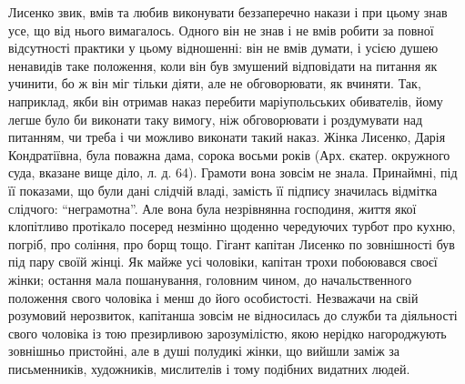 \documentclass[a4paper,20pt]{report}
\begin{document}
Лисенко звик, вмів та любив виконувати беззаперечно накази і при цьому знав усе, що від нього вимагалось.
Одного він не знав і не вмів робити за повної відсутності практики у цьому відношенні: він не вмів думати,
і усією душею ненавидів таке положення, коли він був змушений відповідати на питання як учинити,
бо ж він міг тільки діяти, але не обговорювати, як вчиняти. Так, наприклад, якби він отримав наказ перебити
маріупольських обивателів, йому легше було би виконати таку вимогу, ніж обговорювати і роздумувати над питанням,
чи треба і чи можливо виконати такий наказ.
Жінка Лисенко, Дарія Кондратіївна, була поважна дама, сорока восьми років (Арх.
єкатер. окружного суда, вказане вище діло, л. д. 64). Грамоти вона зовсім не
знала. Принаймні, під її показами, що були дані слідчій владі, замість її
підпису значилась відмітка слідчого: ``неграмотна''. Але вона була незрівнянна
господиня, життя якої клопітливо протікало посеред незмінно щоденно чередуючих
турбот про кухню, погріб, про соління, про борщ тощо. Гігант капітан Лисенко по
зовнішності був під пару своїй жінці.  Як майже усі чоловіки, капітан трохи
побоювався своєї жінки; остання мала пошанування, головним чином, до
начальственного положення свого чоловіка і менш до його особистості. Незважачи
на свій розумовий нерозвиток, капітанша зовсім не відносилась до служби та
діяльності свого чоловіка із тою презирливою зарозумілістю, якою нерідко
нагороджують зовнішньо пристойні, але в душі полудикі жінки, що вийшли заміж за
письменників, художників, мислителів і тому подібних видатних людей.
\end{document}
